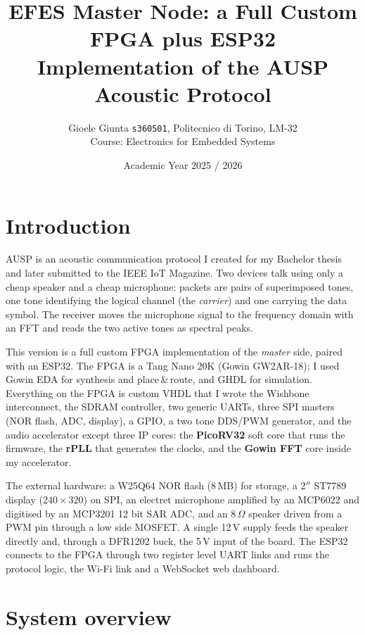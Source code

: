 \documentclass[a4paper,10pt]{article}
\title{\vspace{-1.2cm}\textbf{EFES Master Node: a Full Custom FPGA plus ESP32\\Implementation of the AUSP Acoustic Protocol}}
\author{Gioele Giunta \texttt{s360501}, Politecnico di Torino, LM-32\\ \small Course: Electronics for Embedded Systems}
\date{Academic Year 2025 / 2026}
\begin{document}
\maketitle
\thispagestyle{empty}


\section{Introduction}

AUSP is an acoustic communication protocol I created for my Bachelor thesis and later
submitted to the IEEE IoT Magazine. Two devices talk using only a cheap speaker and a
cheap microphone: packets are pairs of superimposed tones, one tone identifying the
logical channel (the \emph{carrier}) and one carrying the data symbol. The receiver
moves the microphone signal to the frequency domain with an FFT and reads the two
active tones as spectral peaks.

This version is a full custom FPGA implementation of the \emph{master} side, paired
with an ESP32. The FPGA is a Tang Nano 20K (Gowin GW2AR-18); I used Gowin EDA for
synthesis and place\,\&\,route, and GHDL for simulation. Everything on the FPGA is
custom VHDL that I wrote the Wishbone interconnect, the SDRAM controller, two
generic UARTs, three SPI masters (NOR flash, ADC, display), a GPIO, a two tone DDS/PWM
generator, and the audio accelerator except three IP cores: the \textbf{PicoRV32}
soft core that runs the firmware, the \textbf{rPLL} that generates the clocks, and the
\textbf{Gowin FFT} core inside my accelerator.

The external hardware: a W25Q64 NOR flash (8\,MB) for storage, a 2$''$ ST7789 display
($240\times320$) on SPI, an electret microphone amplified by an MCP6022 and digitised
by an MCP3201 12 bit SAR ADC, and an 8\,$\Omega$ speaker driven from a PWM pin through
a low side MOSFET. A single 12\,V supply feeds the speaker directly and, through a
DFR1202 buck, the 5\,V input of the board. The ESP32 connects to the FPGA through two
register level UART links and runs the protocol logic, the Wi-Fi link and a WebSocket
web dashboard.

\section{System overview}
\end{document}
